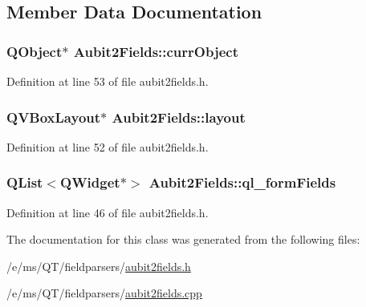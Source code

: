 \subsection{Member Data Documentation}
\hypertarget{classAubit2Fields_ae443d7b94a3674316b2be0eb7a883148}{
\subsubsection[{currObject}]{\setlength{\rightskip}{0pt plus 5cm}QObject$\ast$ {\bf Aubit2Fields::currObject}}}
\label{classAubit2Fields_ae443d7b94a3674316b2be0eb7a883148}


Definition at line 53 of file aubit2fields.h.

\hypertarget{classAubit2Fields_a5e53b1c23f719c00b7e7c93bc31f9499}{
\subsubsection[{layout}]{\setlength{\rightskip}{0pt plus 5cm}QVBoxLayout$\ast$ {\bf Aubit2Fields::layout}}}
\label{classAubit2Fields_a5e53b1c23f719c00b7e7c93bc31f9499}


Definition at line 52 of file aubit2fields.h.

\hypertarget{classAubit2Fields_a57520a544c310f8c9a96cef7d6ffaaf4}{
\subsubsection[{ql\_\-formFields}]{\setlength{\rightskip}{0pt plus 5cm}QList$<$QWidget$\ast$$>$ {\bf Aubit2Fields::ql\_\-formFields}}}
\label{classAubit2Fields_a57520a544c310f8c9a96cef7d6ffaaf4}


Definition at line 46 of file aubit2fields.h.



The documentation for this class was generated from the following files:\begin{DoxyCompactItemize}
\item 
/e/ms/QT/fieldparsers/\hyperlink{aubit2fields_8h}{aubit2fields.h}\item 
/e/ms/QT/fieldparsers/\hyperlink{aubit2fields_8cpp}{aubit2fields.cpp}\end{DoxyCompactItemize}
